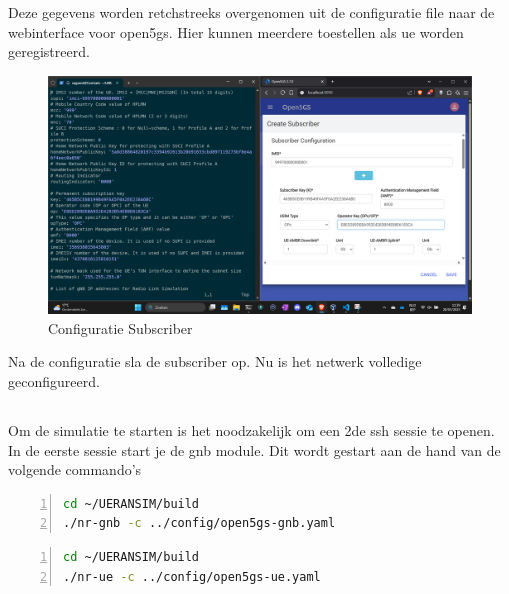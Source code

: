 Deze gegevens worden retchstreeks overgenomen uit de configuratie file naar de webinterface voor \gls{open5gs}. Hier kunnen meerdere toestellen als \gls{ue} worden geregistreerd. 
\begin{figure}[H]
    \includegraphics[width=\linewidth]{../graphics/POC-subConfig.png}
    \caption{Configuratie Subscriber}
    \label{fig:SubConfig}
\end{figure}

Na de configuratie sla de subscriber op. Nu is het netwerk volledige geconfigureerd. 

\subsection{}%
\label{sec:run}%

Om de simulatie te starten is het noodzakelijk om een 2de ssh sessie te openen.
In de eerste sessie start je de \gls{gnb} module. Dit wordt gestart aan de hand van de volgende commando's

\begin{lstlisting}[basicstyle=\small, frame=single, breaklines=true, postbreak=\mbox{\textcolor{red}{$\hookrightarrow$}\space}, escapeinside ={\%,}, escapechar={!}, numbers=left, language=sh, caption=gNB start]
cd ~/UERANSIM/build
./nr-gnb -c ../config/open5gs-gnb.yaml
\end{lstlisting}

\begin{lstlisting}[basicstyle=\small, frame=single, breaklines=true, postbreak=\mbox{\textcolor{red}{$\hookrightarrow$}\space}, escapeinside ={\%,}, escapechar={!}, numbers=left, language=sh, caption=UE start]
cd ~/UERANSIM/build
./nr-ue -c ../config/open5gs-ue.yaml
\end{lstlisting}

